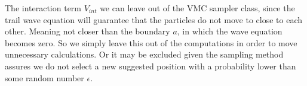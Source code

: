 The interaction term $V_{int}$ we can leave out of the VMC sampler class, since the trail wave equation will guarantee that the particles do not move to close to each other. Meaning not closer than the boundary $a$, in which the wave equation becomes zero. So we simply leave this out of the computations in order to move unnecessary calculations. 
Or it may be excluded given the sampling method assures we do not select a new suggested position with a probability lower than some random number $\epsilon$.  